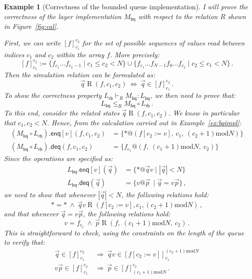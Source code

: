 \documentclass[11pt,oneside]{book}
\newtheorem{example}[theorem]{Example}
\theoremstyle{definition}
\newcommand{\kw}[1]{\ensuremath{ \mathsf{#1} }}
\begin{document}
\begin{example}[Correctness of the bounded queue implementation] %
I will prove the correctness of
the layer implementation $M_\kw{bq}$
with respect to the relation $R$
shown in Figure~\ref{fig:cal}.

First,
we can write $[f]_{c_1}^{c_2}$
for the set of possible sequences of values
read between indices $c_1$ and $c_2$
within the array $f$.
More precisely:
\[
  [f]_{c_1}^{c_2} :=
    \{ f_{c_1} \ldots f_{c_2 - 1} \mid c_1 \le c_2 < N \} \cup
    \{ f_{c_1} \ldots f_{N-1} f_0 \ldots f_{c_2} \mid c_2 \le c_1 < N \}
  \,.
\]
Then the simulation relation can be formulated as:
\[
  \vec{q} \mathrel{R} (f, c_1, c_2)
  \: \Leftrightarrow \:
  \vec{q} \in [f]_{c_1}^{c_2}
  \,.
\]
To show the correctness property
$
  L_\kw{rb} \vdash_R M_\kw{bq} : L_\kw{bq}
$,
we then need to prove that:
\[
  L_\kw{bq} \le_R M_\kw{bq} \circ L_\kw{rb}
  \,.
\]
To this end,
consider the related states
$\vec{q} \mathrel{R} (f, c_1, c_2)$.
We know in particular that $c_1, c_2 < N$.
Hence, from the calculation
carried out in Example~\ref{ex:bqimpl}:
\begin{align*}
  (M_\kw{bq} \circ L_\kw{rb}).{\kw{enq}[v]}(f, c_1, c_2)
    &= \{ *@(f[c_2 := v], \:
          c_1, \:
          (c_2 + 1) \mathbin{\mathrm{mod}} N) \}
  \\
  (M_\kw{bq} \circ L_\kw{rb}).\kw{deq}(f, c_1, c_2)
    &= \{ f_{c_1}@(f, \:
          (c_1 + 1) \mathbin{\mathrm{mod}} N, \:
          c_2) \}
\end{align*}
Since the operations are specified as:
\begin{align*}
  L_\kw{bq}.\kw{enq}[v](\vec{q}) &=
    \{ * @ \vec{q} v \mid |\vec{q}| < N \}
  \\
  L_\kw{bq}.\kw{deq}(\vec{q}) &=
    \{ v @ \vec{p} \: \mid \vec{q} = v \vec{p} \}
  \,,
\end{align*}
we need to show that whenever
$|\vec{q}| < N$,
the following relations hold:
\[
  {*} = {*}
  \: \wedge \:
  \vec{q}v \mathrel{R}
    (f[c_2 := v], c_1, (c_2 + 1) \mathbin{\mathrm{mod}} N)
  \,,
\]
and that whenever $\vec{q} = v\vec{p}$,
the following relations hold:
\[
  v = f_{c_1}
  \: \wedge \:
  \vec{p} \mathrel{R}
    (f, \:
     (c_1 + 1) \mathbin{\mathrm{mod}} N, \:
     c_2)
  \,.
\]
This is straightforward to check,
using the constraints on the length of the queue
to verify that:
\begin{align*}
  \vec{q} \in [f]_{c_1}^{c_2}
    \: &\Rightarrow \:
    \vec{q}v \in [f[c_2 := v]]_{c_1}^{(c_2+1) \mathbin{\mathrm{mod}} N}
  \\
  v\vec{p} \in [f]_{c_1}^{c_2}
    \: &\Rightarrow \:
    \vec{p} \in [f]_{(c_1+1) \mathbin{\mathrm{mod}} N}^{c_2}
  \,.
\end{align*}
\end{example}
\end{document}
